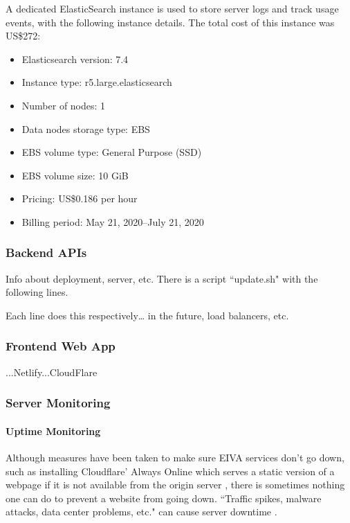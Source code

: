 \documentclass{article}
\begin{document}
A dedicated ElasticSearch instance is used to store server logs and track usage events, with the following instance details. The total cost of this instance was US\$272:

\begin{itemize}
	\item Elasticsearch version: 7.4
	\item Instance type: r5.large.elasticsearch
	\item Number of nodes: 1
	\item Data nodes storage type: EBS
	\item EBS volume type: General Purpose (SSD)
	\item EBS volume size: 10 GiB
	\item Pricing: US\$0.186 per hour
	\item Billing period: May 21, 2020--July 21, 2020
\end{itemize}

\subsubsection{Backend APIs}

Info about deployment, server, etc. There is a script ``update.sh" with the following lines.

Each line does this respectively… in the future, load balancers, etc.

\subsubsection{Frontend Web App}

...Netlify...CloudFlare

\subsubsection{Server Monitoring}

\paragraph{Uptime Monitoring}

Although measures have been taken to make sure EIVA services don't go down, such as installing Cloudflare' Always Online which serves a static version of a webpage if it is not available from the origin server \cite{noauthor_keep_nodate}, there is sometimes nothing one can do to prevent a website from going down. ``Traffic spikes, malware attacks, data center problems, etc." can cause server downtime \cite{noauthor_what_2018}.
\end{document}
